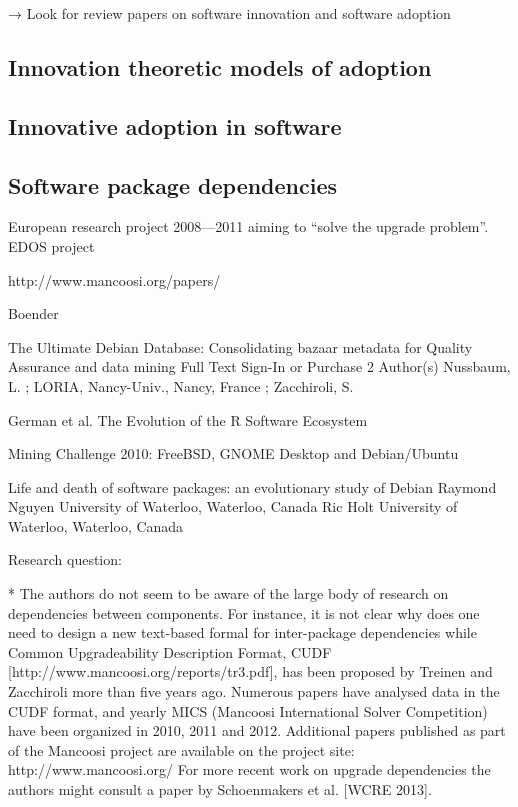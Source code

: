 \documentclass[smallextended,final]{svjour3}
\begin{document}
→ Look for review papers on software innovation and software adoption


\subsection{Innovation theoretic models of adoption}


\subsection{Innovative adoption in software}


\subsection{Software package dependencies}

European research project 2008—2011 aiming to ``solve the upgrade problem''.
EDOS project

http://www.mancoosi.org/papers/

Boender 

The Ultimate Debian Database: Consolidating bazaar metadata for Quality Assurance and data mining
Full Text Sign-In or Purchase
2 Author(s)
Nussbaum, L. ; LORIA, Nancy-Univ., Nancy, France ; Zacchiroli, S.

German et al. The Evolution of the R Software Ecosystem

Mining Challenge 2010: FreeBSD, GNOME Desktop and Debian/Ubuntu


Life and death of software packages: an evolutionary study of Debian
Raymond Nguyen  University of Waterloo, Waterloo, Canada
Ric Holt        University of Waterloo, Waterloo, Canada


Research question:

* The authors do not seem to be aware of the large body of research on dependencies between components. For instance, it is not clear why does one need to design a new text-based formal for inter-package dependencies while Common Upgradeability Description Format, CUDF [http://www.mancoosi.org/reports/tr3.pdf], has been proposed by Treinen and Zacchiroli more than five years ago. Numerous papers have analysed data in the CUDF format, and yearly MICS (Mancoosi International Solver Competition) have been organized in 2010, 2011 and 2012. Additional papers published as part of the Mancoosi project are available on the project site: http://www.mancoosi.org/ For more recent work on upgrade dependencies the authors might consult a paper by Schoenmakers et al. [WCRE 2013].
\end{document}
